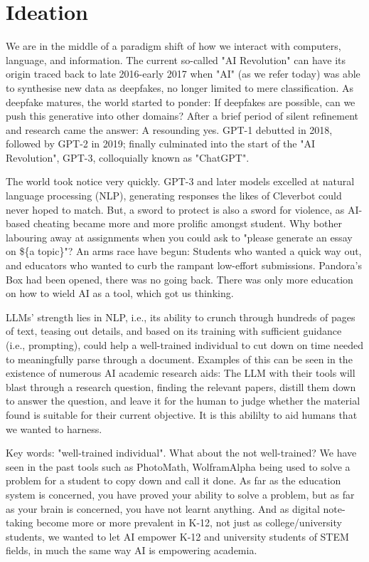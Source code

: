 \def\code#1{\texttt{#1}}

\section{Ideation}
We are in the middle of a paradigm shift of how we interact with computers, language, and information. The current
so-called "AI Revolution" can have its origin traced back to late 2016-early 2017 when "AI" (as we refer today) was able
to synthesise new data as deepfakes, no longer limited to mere classification. As deepfake matures, the world started to
ponder: If deepfakes are possible, can we push this generative into other domains? After a brief period of silent
refinement and research came the answer: A resounding yes. GPT-1 debutted in  2018, followed by GPT-2 in 2019; finally
culminated into the start of the "AI Revolution", GPT-3, colloquially known as "ChatGPT".

The world took notice very quickly. GPT-3 and later models excelled at natural language processing (NLP), generating
responses the likes of Cleverbot could never hoped to match. But, a sword to protect is also a sword for violence, as
AI-based cheating became more and more prolific amongst student. Why bother labouring away at assignments when you
could ask to "please generate an essay on \$\{a topic\}"? An arms race have begun: Students who wanted a quick way out,
and educators who wanted to curb the rampant low-effort submissions. Pandora's Box had been opened, there was no going
back. There was only more education on how to wield AI as a tool, which got us thinking.

LLMs' strength lies in NLP, i.e., its ability to crunch through hundreds of pages of text, teasing out details, and
based on its training with sufficient guidance (i.e., prompting), could help a well-trained individual to cut down on
time needed to meaningfully parse through a document. Examples of this can be seen in the existence of numerous AI
academic research aids: The LLM with their tools will blast through a research question, finding the relevant papers,
distill them down to answer the question, and leave it for the human to judge whether the material found is suitable
for their current objective. It is this abililty to aid humans that we wanted to harness.

Key words: "well-trained individual". What about the not well-trained? We have seen in the past tools such as PhotoMath,
WolframAlpha being used to solve a problem for a student to copy down and call it done. As far as the education system
is concerned, you have proved your ability to solve a problem, but as far as your brain is concerned, you have not
learnt anything. And as digital note-taking become more or more prevalent in K-12, not just as college/university
students, we wanted to let AI empower K-12 and university students of STEM fields, in much the same way AI is
empowering academia.

